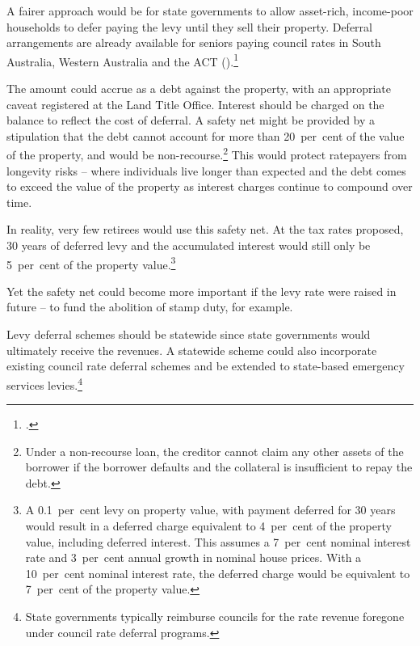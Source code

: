 \documentclass[twoside,english]{palatinob5ona4portrait}
\begin{document}
A fairer approach would be for state governments to allow asset-rich, income-poor households to defer paying the levy until they sell their property. Deferral arrangements are already available for seniors paying council rates in South Australia, Western Australia and the ACT ().\footcite{Brownfield2014} 

The amount could accrue as a debt against the property, with an appropriate caveat registered at the Land Title Office. Interest should be charged on the balance to reflect the cost of deferral. A safety net might be provided by a stipulation that the debt cannot account for more than 20~per~cent of the value of the property, and would be non-recourse.\footnote{Under a non-recourse loan, the creditor cannot claim any other assets of the borrower if the borrower defaults and the collateral is insufficient to repay the debt.}  This would protect ratepayers from longevity risks – where individuals live longer than expected and the debt comes to exceed the value of the property as interest charges continue to compound over time. 

In reality, very few retirees would use this safety net. At the tax rates proposed, 30 years of deferred levy and the accumulated interest would still only be 5~per~cent of the property value.\footnote{A 0.1~per~cent levy on property value, with payment deferred for 30 years would result in a deferred charge equivalent to 4~per~cent of the property value, including deferred interest. This assumes a 7~per~cent nominal interest rate and 3~per~cent annual growth in nominal house prices. With a 10~per~cent nominal interest rate, the deferred charge would be equivalent to 7~per~cent of the property value.}  

Yet the safety net could become more important if the levy rate were raised in future -- to fund the abolition of stamp duty, for example. 

Levy deferral schemes should be statewide since state governments would ultimately receive the revenues. A statewide scheme could also incorporate existing council rate deferral schemes and be extended to state-based emergency services levies.\footnote{State governments typically reimburse councils for the rate revenue foregone under council rate deferral programs.} 
\end{document}
